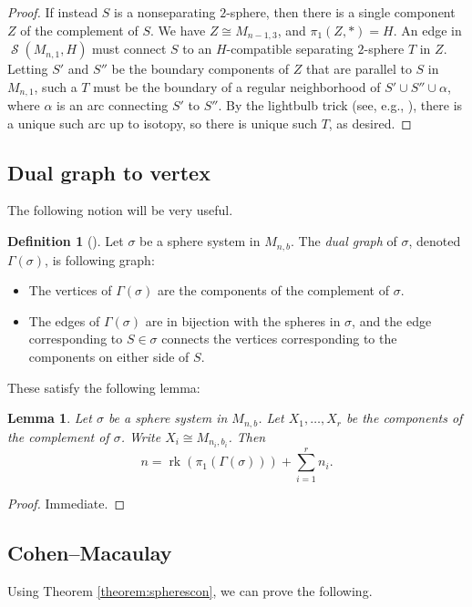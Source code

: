 \documentclass[11pt]{amsart}
\numberwithin{equation}{section}
\theoremstyle{plain}
\newtheorem{lemma}[theorem]{Lemma}
\theoremstyle{definition}
\newtheorem{defn}[theorem]{Definition}
\newenvironment{definition}[1][]{\begin{defn}[#1]\pushQED{\qed}}{\popQED \end{defn}}
\theoremstyle{remark}
\DeclareMathOperator{\rank}{rk}
\DeclareMathOperator{\Spheres}{\mathcal{S}}
\begin{document}
\begin{proof}
If instead $S$ is a nonseparating $2$-sphere, then there is a single component $Z$ of the complement
of $S$.  We have $Z \cong M_{n-1,3}$, and $\pi_1(Z,\ast) = H$.  An edge in $\Spheres(M_{n,1},H)$
must connect $S$ to an $H$-compatible separating $2$-sphere $T$ in $Z$.  Letting $S'$ and $S''$
be the boundary components of $Z$ that are parallel to $S$ in $M_{n,1}$, such a $T$ must be
the boundary of a regular neighborhood of $S' \cup S'' \cup \alpha$, where $\alpha$ is an arc
connecting $S'$ to $S''$.  By the lightbulb trick (see, e.g., \cite[Exercise 9.F.4]{RolfsenKnots}), there is a unique such arc up to isotopy, so
there is unique such $T$, as desired.
\end{proof}

\subsection{Dual graph to vertex}
The following notion will be very useful.

\begin{definition}
Let $\sigma$ be a sphere system in $M_{n,b}$.  The {\em dual graph} of $\sigma$, denoted $\Gamma(\sigma)$,
is following graph:
\begin{itemize}
\item The vertices of $\Gamma(\sigma)$ are the components of the complement of $\sigma$.
\item The edges of $\Gamma(\sigma)$ are in bijection with the spheres in $\sigma$, and the
edge corresponding to $S \in \sigma$ connects the vertices corresponding to the components
on either side of $S$.\qedhere
\end{itemize}
\end{definition}

These satisfy the following lemma:

\begin{lemma}
\label{lemma:dualgraph}
Let $\sigma$ be a sphere system in $M_{n,b}$.  Let $X_1,\ldots,X_r$ be the components
of the complement of $\sigma$.  Write $X_i \cong M_{n_i,b_i}$.  Then
\[n = \rank(\pi_1(\Gamma(\sigma))) + \sum_{i=1}^r n_i.\]
\end{lemma}
\begin{proof}
Immediate.
\end{proof}

\subsection{Cohen--Macaulay}
Using Theorem \ref{theorem:spherescon}, we can prove the following.
\end{document}
